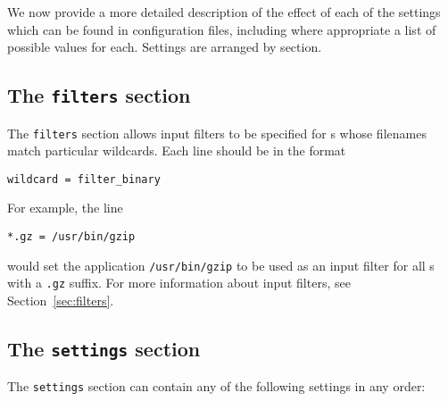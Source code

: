 We now provide a more detailed description of the effect of each of the
settings which can be found in configuration files, including where appropriate
a list of possible values for each. Settings are arranged by section.

\subsection{The {\tt filters} section}

The {\tt filters} section allows input filters to be specified for \datafile s
whose filenames match particular wildcards. Each line should be in the format
\begin{verbatim}
wildcard = filter_binary
\end{verbatim}
For example, the line
\begin{verbatim}
*.gz = /usr/bin/gzip
\end{verbatim}
would set the application {\tt /usr/bin/gzip} to be used as an input filter for
all \datafile s with a {\tt .gz} suffix. For more information about input
filters, see Section~\ref{sec:filters}.

\subsection{The {\tt settings} section}
\label{sec:configfile_settings}

The {\tt settings} section can contain any of the following settings in any order:

